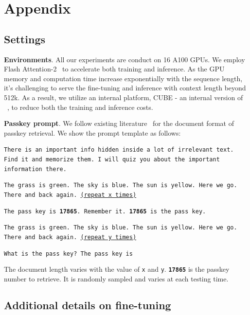 \documentclass{article}
\theoremstyle{plain}
\theoremstyle{definition}
\theoremstyle{remark}
\begin{document}
	\newpage
	\appendix 
	\onecolumn
	
\section{Appendix}

\subsection{Settings}
\noindent\textbf{Environments}. All our experiments are conduct on 16 A100 GPUs. We employ Flash Attention-2~\cite{dao2023flashattention2} to accelerate both training and inference. As the  GPU memory and computation time increase exponentially with the sequence length, it's challenging to serve the fine-tuning and inference with context length beyond 512k. %
As a result, we utilize an internal platform, CUBE - an internal version of ~\cite{cube}, to reduce both the training and inference costs. 


\noindent\textbf{Passkey prompt}. 
We follow existing literature~\cite{passkey, pi, yarn, longlora, zhu2023pose} for the document format of passkey retrieval.  We show the prompt template as follows:

\texttt{There is an important info hidden inside a lot of irrelevant text. Find it and memorize them. I will quiz you about the important information there.}

\texttt{The grass is green. The sky is blue. The sun is yellow. Here we go. There and back again. \underline{(repeat x times)}}

\texttt{The pass key is \textbf{17865}. Remember it. \textbf{17865} is the pass key.}

\texttt{The grass is green. The sky is blue. The sun is yellow. Here we go. There and back again. \underline{(repeat y times)}}

\texttt{What is the pass key? The pass key is}

The document length varies with the value of \texttt{x} and \texttt{y}. \texttt\textbf{17865} is the passkey number to retrieve. It is randomly sampled and varies at each testing time. 


\subsection{Additional details on fine-tuning}
\end{document}
